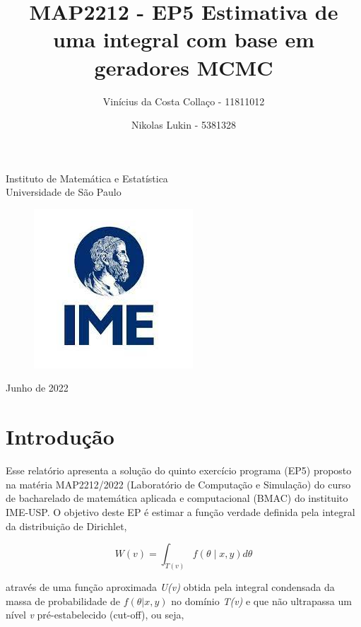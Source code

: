 \documentclass{article}
\title{MAP2212 - EP5 Estimativa de uma integral com base em geradores MCMC}
\author{Vinícius da Costa Collaço - 11811012 \and Nikolas Lukin - 5381328}
\begin{document}
\setlength{\parindent}{1cm} 
\maketitle
\begin{center}
\Large{Instituto de Matemática e Estatística}\\
\Large{Universidade de São Paulo}\\
\begin{figure}[htp]
  \centering
  \includegraphics[scale=1]{Imagens/IME.jpg}
  \label{fig:IME}
\end{figure}
\Large{Junho de 2022}
\end{center}
\pagebreak
\tableofcontents
\pagebreak

\maketitle

\section{Introdução}
\indent
Esse relatório apresenta a solução do quinto exercício programa (EP5) proposto na matéria MAP2212/2022 (Laboratório de Computação e Simulação) do curso de bacharelado de matemática aplicada e computacional (BMAC) do instituito IME-USP. O objetivo deste EP é estimar a função verdade definida pela integral da distribuição de Dirichlet,

\begin{equation}
    W(v)= \int_{T(v)} f(\theta\mid x,y)d\theta 
\end{equation}

através de uma função aproximada \textit{U(v)} obtida pela integral condensada da massa de probabilidade\cite{kaplan1987improved} de $f(\theta|x,y)$ no domínio \textit {T(v)} e que não ultrapassa um nível \textit{v} pré-estabelecido (cut-off), ou seja,
\end{document}
